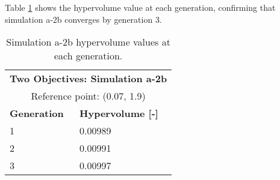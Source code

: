Table \ref{tab:a2b-hypervolume} shows the hypervolume value at each generation, 
confirming that simulation a-2b converges by generation 3. 
\begin{table}[htbp!]
    \centering
    \onehalfspacing
    \caption{Simulation a-2b hypervolume values at each generation.}
	\label{tab:a2b-hypervolume}
    \footnotesize
    \begin{tabular}{ll}
    \hline 
    \multicolumn{2}{c}{\textbf{Two Objectives: Simulation a-2b}} \\
    \multicolumn{2}{c}{Reference point: (0.07, 1.9)} \\
    \hline 
    \textbf{Generation} & \textbf{Hypervolume [-]} \\
    \hline
    1 & 0.00989 \\
    2 & 0.00991 \\
    3 & 0.00997 \\
    \hline
    \end{tabular}
\end{table}

